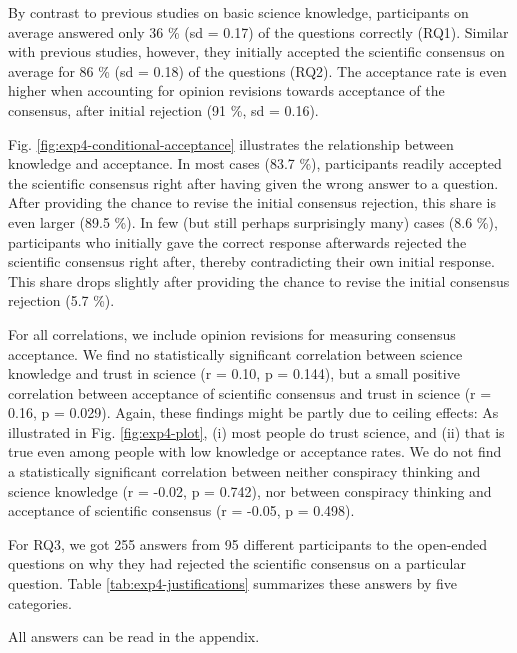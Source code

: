 \documentclass[
  doc,floatsintext]{apa6}
\begin{document}
By contrast to previous studies on basic science knowledge, participants on average answered only 36 \% (sd = 0.17) of the questions correctly (RQ1). Similar with previous studies, however, they initially accepted the scientific consensus on average for 86 \% (sd = 0.18) of the questions (RQ2). The acceptance rate is even higher when accounting for opinion revisions towards acceptance of the consensus, after initial rejection (91 \%, sd = 0.16).

Fig. \ref{fig:exp4-conditional-acceptance} illustrates the relationship between knowledge and acceptance. In most cases (83.7 \%), participants readily accepted the scientific consensus right after having given the wrong answer to a question. After providing the chance to revise the initial consensus rejection, this share is even larger (89.5 \%). In few (but still perhaps surprisingly many) cases (8.6 \%), participants who initially gave the correct response afterwards rejected the scientific consensus right after, thereby contradicting their own initial response. This share drops slightly after providing the chance to revise the initial consensus rejection (5.7 \%).

For all correlations, we include opinion revisions for measuring consensus acceptance. We find no statistically significant correlation between science knowledge and trust in science (r = 0.10, p = 0.144), but a small positive correlation between acceptance of scientific consensus and trust in science (r = 0.16, p = 0.029). Again, these findings might be partly due to ceiling effects: As illustrated in Fig. \ref{fig:exp4-plot}, (i) most people do trust science, and (ii) that is true even among people with low knowledge or acceptance rates. We do not find a statistically significant correlation between neither conspiracy thinking and science knowledge (r = -0.02, p = 0.742), nor between conspiracy thinking and acceptance of scientific consensus (r = -0.05, p = 0.498).

For RQ3, we got 255 answers from 95 different participants to the open-ended questions on why they had rejected the scientific consensus on a particular question. Table \ref{tab:exp4-justifications} summarizes these answers by five categories.

All answers can be read in the appendix.
\end{document}
